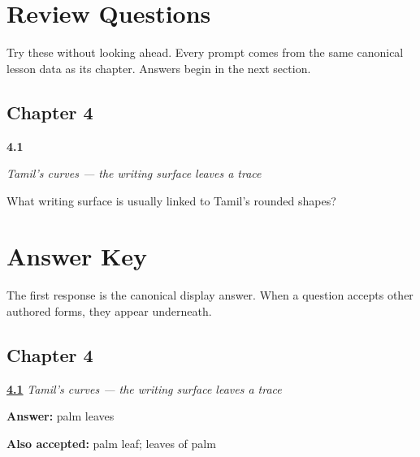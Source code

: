 
\chapter*{Review Questions}

Try these without looking ahead. Every prompt comes from the same canonical lesson data as its chapter. Answers begin in the next section.

\section*{Chapter 4}

\noindent\begin{minipage}[t]{\linewidth}
\raggedright
\hypertarget{review-TA-W01-curves-va-ka-writing-surface}{\textbf{4.1}} \emph{Tamil's curves — the writing surface leaves a trace}\par
\small What writing surface is usually linked to Tamil's rounded shapes?
\end{minipage}\par\medskip

\chapter*{Answer Key}

The first response is the canonical display answer. When a question accepts other authored forms, they appear underneath.

\section*{Chapter 4}

\noindent\begin{minipage}[t]{\linewidth}
\raggedright
\hyperlink{review-TA-W01-curves-va-ka-writing-surface}{\textbf{4.1}} \emph{Tamil's curves — the writing surface leaves a trace}\par
\small \textbf{Answer:} palm leaves\par
\footnotesize \textbf{Also accepted:} palm leaf; leaves of palm
\end{minipage}\par\medskip
